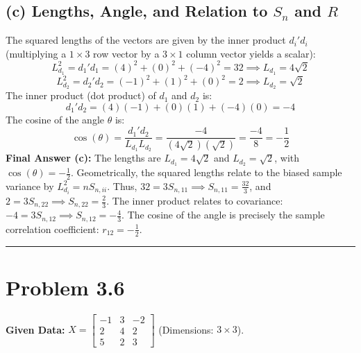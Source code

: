 \documentclass[12pt]{article}
\begin{document}
\subsection*{(c) Lengths, Angle, and Relation to $S_n$ and $R$}
The squared lengths of the vectors are given by the inner product $d_i'd_i$ (multiplying a $1 \times 3$ row vector by a $3 \times 1$ column vector yields a scalar):
$$ L_{d_1}^2 = d_1' d_1 = (4)^2 + (0)^2 + (-4)^2 = 32 \implies L_{d_1} = 4\sqrt{2} $$
$$ L_{d_2}^2 = d_2' d_2 = (-1)^2 + (1)^2 + (0)^2 = 2 \implies L_{d_2} = \sqrt{2} $$
The inner product (dot product) of $d_1$ and $d_2$ is:
$$ d_1' d_2 = (4)(-1) + (0)(1) + (-4)(0) = -4 $$
The cosine of the angle $\theta$ is:
$$ \cos(\theta) = \frac{d_1' d_2}{L_{d_1} L_{d_2}} = \frac{-4}{(4\sqrt{2})(\sqrt{2})} = \frac{-4}{8} = -\frac{1}{2} $$
\textbf{Final Answer (c):} The lengths are $L_{d_1} = 4\sqrt{2}$ and $L_{d_2} = \sqrt{2}$, with $\cos(\theta) = -\frac{1}{2}$. 
Geometrically, the squared lengths relate to the biased sample variance by $L_{d_i}^2 = n S_{n,ii}$. Thus, $32 = 3 S_{n,11} \implies S_{n,11} = \frac{32}{3}$, and $2 = 3 S_{n,22} \implies S_{n,22} = \frac{2}{3}$. The inner product relates to covariance: $-4 = 3 S_{n,12} \implies S_{n,12} = -\frac{4}{3}$. The cosine of the angle is precisely the sample correlation coefficient: $r_{12} = -\frac{1}{2}$.

\rule{\textwidth}{0.4pt}

\section*{Problem 3.6}
\textbf{Given Data:} $X = \begin{bmatrix} -1 & 3 & -2 \\ 2 & 4 & 2 \\ 5 & 2 & 3 \end{bmatrix}$ (Dimensions: $3 \times 3$).
\end{document}
